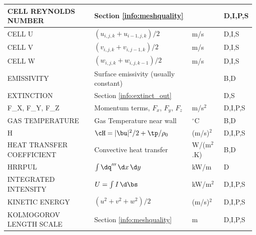 \documentclass[11pt]{book}
\begin{document}
\begin{longtable}{@{\extracolsep{\fill}}|l|l|l|l|}
{\ct CELL REYNOLDS NUMBER}                      & Section \ref{info:meshquality}                    &                & D,I,P,S      \\ \hline
{\ct CELL U}                                    & $(u_{i,j,k}+u_{i-1,j,k})/2$                       & m/s            & D,I,S        \\ \hline
{\ct CELL V}                                    & $(v_{i,j,k}+v_{i,j-1,k})/2$                       & m/s            & D,I,S        \\ \hline
{\ct CELL W}                                    & $(w_{i,j,k}+w_{i,j,k-1})/2$                       & m/s            & D,I,S        \\ \hline
{\ct EMISSIVITY}                                & Surface emissivity (usually constant)             &                & B,D          \\ \hline
{\ct EXTINCTION}                                & Section \ref{info:extinct_out}                    &                & D,S          \\ \hline
{\ct F\_X, F\_Y, F\_Z}                          & Momentum terms, $F_x$, $F_y$, $F_z$               & m/s$^2$        & D,I,P,S      \\ \hline
{\ct GAS TEMPERATURE}                           & Gas Temperature near wall                         & $^\circ$C      & B,D          \\ \hline
{\ct H}                                         & $\cH=|\bu|^2/2 + \tp/\rho_0$                    & (m/s)$^2$      & D,I,P,S        \\ \hline
{\ct HEAT TRANSFER COEFFICIENT}                 & Convective heat transfer                          & \si{W/(m$^2$.K)} & B,D        \\ \hline
{\ct HRRPUL}                                    & $\int \dq''' \, \d x \, \d y$                     & kW/m           & D            \\ \hline
{\ct INTEGRATED INTENSITY}                      & $U=\int I \, \d \bs$                              & kW/m$^2$       & D,I,P,S      \\ \hline
{\ct KINETIC ENERGY}                            & $(u^2+v^2+w^2)/2$                                 & (m/s)$^2$      & D,I,P,S      \\ \hline
{\ct KOLMOGOROV LENGTH SCALE}                   & Section \ref{info:meshquality}                    & m              & D,I,P,S      \\ \hline

\end{longtable}
\end{document}
